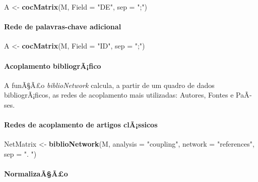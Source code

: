 \documentclass[]{article}
\newenvironment{Shaded}{\begin{snugshade}}{\end{snugshade}}
\newcommand{\KeywordTok}[1]{\textcolor[rgb]{0.13,0.29,0.53}{\textbf{#1}}}
\newcommand{\DataTypeTok}[1]{\textcolor[rgb]{0.13,0.29,0.53}{#1}}
\newcommand{\StringTok}[1]{\textcolor[rgb]{0.31,0.60,0.02}{#1}}
\newcommand{\NormalTok}[1]{#1}
\let\oldparagraph\paragraph
\renewcommand{\paragraph}[1]{\oldparagraph{#1}\mbox{}}
\begin{document}
\begin{Shaded}
\begin{Highlighting}[]
\NormalTok{A <-}\StringTok{ }\KeywordTok{cocMatrix}\NormalTok{(M, }\DataTypeTok{Field =} \StringTok{"DE"}\NormalTok{, }\DataTypeTok{sep =} \StringTok{";"}\NormalTok{)}
\end{Highlighting}
\end{Shaded}

\paragraph{Rede de palavras-chave
adicional}\label{rede-de-palavras-chave-adicional}

\begin{Shaded}
\begin{Highlighting}[]
\NormalTok{A <-}\StringTok{ }\KeywordTok{cocMatrix}\NormalTok{(M, }\DataTypeTok{Field =} \StringTok{"ID"}\NormalTok{, }\DataTypeTok{sep =} \StringTok{";"}\NormalTok{)}
\end{Highlighting}
\end{Shaded}

\paragraph{Acoplamento bibliogrÃ¡fico}\label{acoplamento-bibliografico}

A funÃ§Ã£o \emph{biblioNetwork} calcula, a partir de um quadro de dados
bibliogrÃ¡ficos, as redes de acoplamento mais utilizadas: Autores,
Fontes e PaÃ­ses.

\paragraph{Redes de acoplamento de artigos
clÃ¡ssicos}\label{redes-de-acoplamento-de-artigos-classicos}

\begin{Shaded}
\begin{Highlighting}[]
\NormalTok{NetMatrix <-}\StringTok{ }\KeywordTok{biblioNetwork}\NormalTok{(M, }\DataTypeTok{analysis =} \StringTok{"coupling"}\NormalTok{, }
                           \DataTypeTok{network =} \StringTok{"references"}\NormalTok{, }\DataTypeTok{sep =} \StringTok{".  "}\NormalTok{)}
\end{Highlighting}
\end{Shaded}

\paragraph{NormalizaÃ§Ã£o}\label{normalizaaao}
\end{document}
